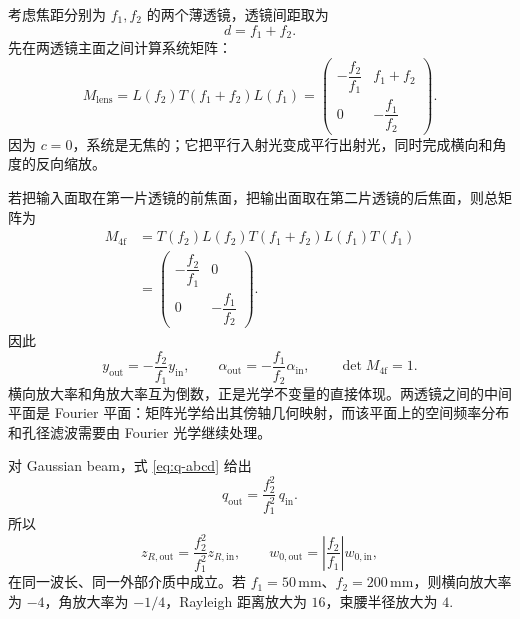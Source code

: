 考虑焦距分别为 \(f_1,f_2\) 的两个薄透镜，透镜间距取为
\[
	d=f_1+f_2.
\]
先在两透镜主面之间计算系统矩阵：
\begin{equation}
	M_{\mathrm{lens}}=
	L(f_2)T(f_1+f_2)L(f_1)
	=
	\begin{pmatrix}
		-\dfrac{f_2}{f_1}&f_1+f_2\\[6pt]
		0&-\dfrac{f_1}{f_2}
	\end{pmatrix}.
\end{equation}
因为 \(c=0\)，系统是无焦的；它把平行入射光变成平行出射光，同时完成横向和角度的反向缩放。

若把输入面取在第一片透镜的前焦面，把输出面取在第二片透镜的后焦面，则总矩阵为
\begin{align}
	M_{\mathrm{4f}}
	&=T(f_2)L(f_2)T(f_1+f_2)L(f_1)T(f_1)\\
	&=
	\begin{pmatrix}
		-\dfrac{f_2}{f_1}&0\\[6pt]
		0&-\dfrac{f_1}{f_2}
	\end{pmatrix}.
\end{align}
因此
\begin{equation}
	y_{\mathrm{out}}=-\frac{f_2}{f_1}y_{\mathrm{in}},
\qquad
\alpha_{\mathrm{out}}=-\frac{f_1}{f_2}\alpha_{\mathrm{in}},
\qquad
\det M_{\mathrm{4f}}=1.
\end{equation}
横向放大率和角放大率互为倒数，正是光学不变量的直接体现。两透镜之间的中间平面是 Fourier 平面：矩阵光学给出其傍轴几何映射，而该平面上的空间频率分布和孔径滤波需要由 Fourier 光学继续处理。

对 Gaussian beam，式 \eqref{eq:q-abcd} 给出
\begin{equation}
	q_{\mathrm{out}}
	=\frac{f_2^2}{f_1^2}\,q_{\mathrm{in}}.
\end{equation}
所以
\begin{equation}
	z_{R,\mathrm{out}}=\frac{f_2^2}{f_1^2}z_{R,\mathrm{in}},
\qquad
	w_{0,\mathrm{out}}=\left|\frac{f_2}{f_1}\right|w_{0,\mathrm{in}},
\end{equation}
在同一波长、同一外部介质中成立。若 \(f_1=50\,\mathrm{mm}\)、\(f_2=200\,\mathrm{mm}\)，则横向放大率为 \(-4\)，角放大率为 \(-1/4\)，Rayleigh 距离放大为 \(16\)，束腰半径放大为 \(4\).
